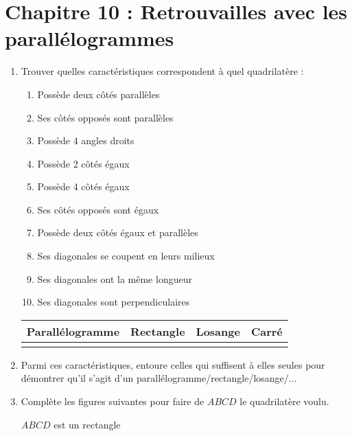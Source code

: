 \section*{Chapitre 10 : Retrouvailles avec les parallélogrammes}

\begin{enumerate}[leftmargin=0cm]
    \item Trouver quelles caractéristiques correspondent à quel quadrilatère :

\begin{multicols}{2}
\begin{enumerate}[label=\alph*.]
    \item Possède deux côtés parallèles
    \item Ses côtés opposés sont parallèles
    \item Possède 4 angles droits
    \item Possède 2 côtés égaux
    \item Possède 4 côtés égaux
    \item Ses côtés opposés sont égaux
    \item Possède deux côtés égaux et parallèles
    \item Ses diagonales se coupent en leurs milieux
    \item Ses diagonales ont la même longueur
    \item Ses diagonales sont perpendiculaires
\end{enumerate}
\end{multicols}


\newcommand{\hot}{\vspace*{12cm}}

\begin{tabularx}{\textwidth}{Y*{3}{|Y}}
    Parallélogramme & Rectangle & Losange & Carré \\\hline
     \hot &\hot&\hot&\hot\\
\end{tabularx}

\item Parmi ces caractéristiques, entoure celles qui suffisent à elles seules pour démontrer qu'il s'agit d'un parallélogramme/rectangle/losange/...

\item Complète les figures suivantes pour faire de $ABCD$ le quadrilatère voulu.

\begin{multicols}{3}
    $ABCD$ est un rectangle



\end{multicols}
\end{enumerate}
